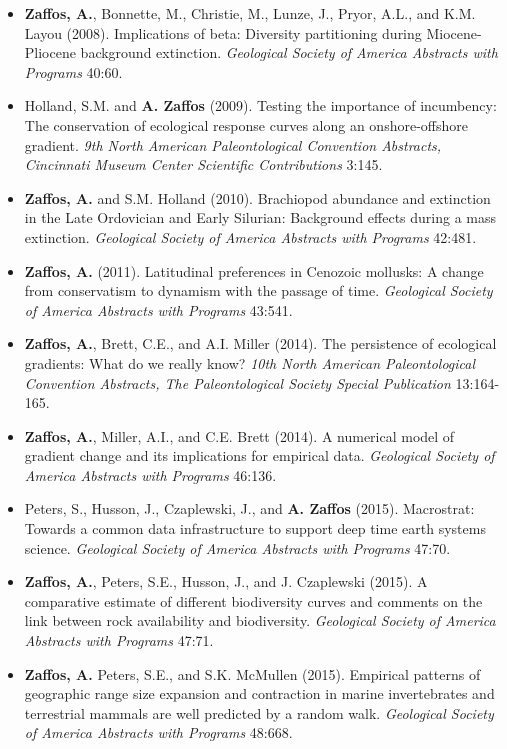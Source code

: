 \documentclass[12pt, a4paper]{awesome-cv}
\begin{document}
\fontsize{10pt}{1em}\bodyfontlight\upshape\color{text}
\begin{itemize}[leftmargin=*]
\item{\textbf{Zaffos, A.}, Bonnette, M., Christie, M., Lunze, J., Pryor, A.L., and K.M. Layou (2008). Implications of beta: Diversity partitioning during Miocene-Pliocene background extinction. \textit{Geological Society of America Abstracts with Programs} 40:60.}
\item{Holland, S.M. and \textbf{A. Zaffos} (2009). Testing the importance of incumbency: The conservation of ecological response curves along an onshore-offshore gradient. \textit{9th North American Paleontological Convention Abstracts, Cincinnati Museum Center Scientific Contributions} 3:145.}
\item{\textbf{Zaffos, A.} and S.M. Holland (2010). Brachiopod abundance and extinction in the Late Ordovician and Early Silurian: Background effects during a mass extinction. \textit{Geological Society of America Abstracts with Programs} 42:481.}
\item{\textbf{Zaffos, A.} (2011). Latitudinal preferences in Cenozoic mollusks: A change from conservatism to dynamism with the passage of time. \textit{Geological Society of America Abstracts with Programs} 43:541.}
\item{\textbf{Zaffos, A.}, Brett, C.E., and A.I. Miller (2014). The persistence of ecological gradients: What do we really know? \textit{10th North American Paleontological Convention Abstracts, The Paleontological Society Special Publication} 13:164-165.}
\item{\textbf{Zaffos, A.}, Miller, A.I., and C.E. Brett (2014). A numerical model of gradient change and its implications for empirical data. \textit{Geological Society of America Abstracts with Programs} 46:136.}
\item{Peters, S., Husson, J., Czaplewski, J., and \textbf{A. Zaffos} (2015). Macrostrat: Towards a common data infrastructure to support deep time earth systems science. \textit{Geological Society of America Abstracts with Programs} 47:70.}
\item{\textbf{Zaffos, A.}, Peters, S.E., Husson, J., and J. Czaplewski (2015). A comparative estimate of different biodiversity curves and comments on the link between rock availability and biodiversity. \textit{Geological Society of America Abstracts with Programs} 47:71.}
\item{\textbf{Zaffos, A.} Peters, S.E., and S.K. McMullen (2015). Empirical patterns of geographic range size expansion and contraction in marine invertebrates and terrestrial mammals are well predicted by a random walk. \textit{Geological Society of America Abstracts with Programs} 48:668.}

\end{itemize}
\end{document}
